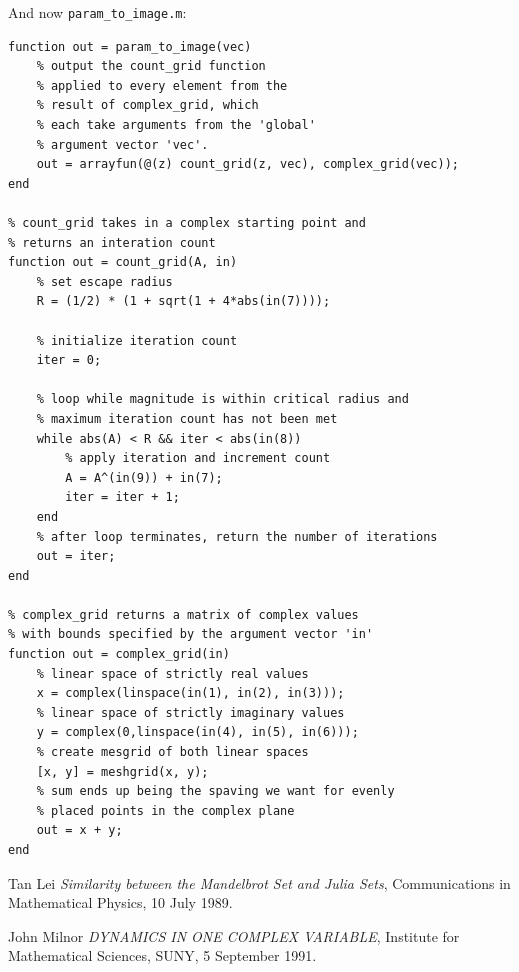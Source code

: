 \documentclass[12pt]{article}
\begin{document}
And now \texttt{param\_to\_image.m}:
\begin{verbatim}
function out = param_to_image(vec)
    % output the count_grid function
    % applied to every element from the 
    % result of complex_grid, which
    % each take arguments from the 'global'
    % argument vector 'vec'.
    out = arrayfun(@(z) count_grid(z, vec), complex_grid(vec));
end

% count_grid takes in a complex starting point and 
% returns an interation count
function out = count_grid(A, in)
    % set escape radius
    R = (1/2) * (1 + sqrt(1 + 4*abs(in(7))));
    
    % initialize iteration count
    iter = 0;
    
    % loop while magnitude is within critical radius and
    % maximum iteration count has not been met
    while abs(A) < R && iter < abs(in(8))
        % apply iteration and increment count
        A = A^(in(9)) + in(7);
        iter = iter + 1;
    end
    % after loop terminates, return the number of iterations
    out = iter;
end

% complex_grid returns a matrix of complex values
% with bounds specified by the argument vector 'in'
function out = complex_grid(in)
    % linear space of strictly real values
    x = complex(linspace(in(1), in(2), in(3)));
    % linear space of strictly imaginary values
    y = complex(0,linspace(in(4), in(5), in(6)));
    % create mesgrid of both linear spaces
    [x, y] = meshgrid(x, y);
    % sum ends up being the spaving we want for evenly
    % placed points in the complex plane
    out = x + y;
end
\end{verbatim}

\begin{thebibliography}{1}

 Tan Lei {\em Similarity between the Mandelbrot Set and Julia Sets}, Communications in Mathematical Physics, 10 July 1989.

 John Milnor {\em DYNAMICS IN ONE COMPLEX VARIABLE}, Institute for Mathematical Sciences,  SUNY, 5 September 1991. 

\end{thebibliography}
\end{document}

